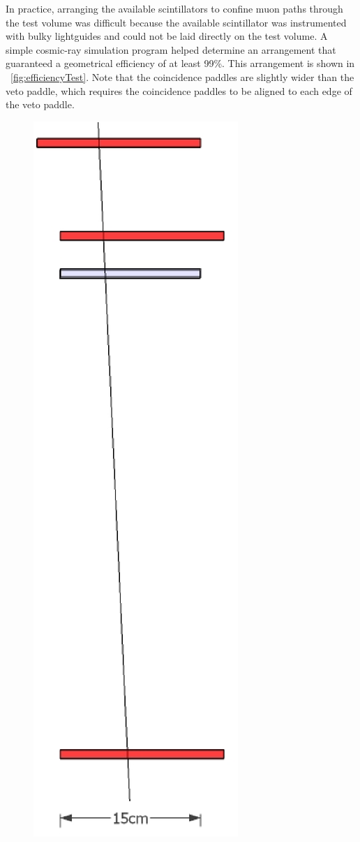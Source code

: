In practice, arranging the available scintillators to confine muon paths through the test volume was difficult because the available scintillator was instrumented with bulky lightguides and could not be laid directly on the test volume.  A simple cosmic-ray simulation program helped determine an arrangement that guaranteed a geometrical efficiency of at least 99\%.  This arrangement is shown in {\fig}~\ref{fig:efficiencyTest}.  Note that the coincidence paddles are slightly wider than the veto paddle, which requires the coincidence paddles to be aligned to each edge of the veto paddle.  
\begin{figure}[!htbp]
\centering
\includegraphics[height=0.8\textheight]{figures/veto_test.eps}

\end{figure}
